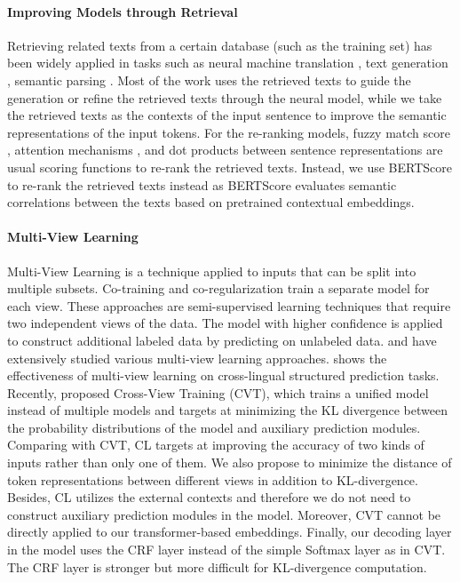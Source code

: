\documentclass[11pt,a4paper]{article}
\begin{document}
\paragraph{Improving Models through Retrieval}
Retrieving related texts from a certain database (such as the training set) has been widely applied in tasks such as neural machine translation \citep{gu2018search,zhang-etal-2018-guiding,xu-etal-2020-boosting}, text generation \citep{weston-etal-2018-retrieve,kim-etal-2020-retrieval}, semantic parsing \citep{hashimoto2018retrieve,guo-etal-2019-coupling}. Most of the work uses the retrieved texts to guide the generation or refine the retrieved texts through the neural model, while we take the retrieved texts as the contexts of the input sentence to improve the semantic representations of the input tokens.
For the re-ranking models, fuzzy match score \citep{gu2018search,zhang-etal-2018-guiding,hayati-etal-2018-retrieval,xu-etal-2020-boosting}, attention mechanisms \citep{cao-etal-2018-retrieve,cai-etal-2019-retrieval}, and dot products between sentence representations \citep{lewis2020retrieval,xu-etal-2020-boosting} are usual scoring functions to re-rank the retrieved texts. Instead, we use BERTScore to re-rank the retrieved texts instead as BERTScore evaluates semantic correlations between the texts based on pretrained contextual embeddings.


\paragraph{Multi-View Learning}
Multi-View Learning is a technique applied to inputs that can be split into multiple subsets. Co-training \citep{blum1998combining} and co-regularization \citep{sindhwani2005co} train a separate model for each view. These approaches are semi-supervised learning techniques that require two independent views of the data. The model with higher confidence is applied to construct additional labeled data by predicting on unlabeled data. \citet{sun2013survey} and \citet{xu2013survey} have extensively studied various multi-view learning approaches. \citet{hu2021multi} shows the effectiveness of multi-view learning on cross-lingual structured prediction tasks. Recently, \citet{clark-etal-2018-semi} proposed Cross-View Training (CVT), which trains a unified model instead of multiple models and targets at minimizing the KL divergence between the probability distributions of the model and auxiliary prediction modules. Comparing with CVT, CL targets at improving the accuracy of two kinds of inputs rather than only one of them. We also propose to minimize the distance of token representations between different views in addition to KL-divergence. Besides, CL utilizes the external contexts and therefore we do not need to construct auxiliary prediction modules in the model. Moreover, CVT cannot be directly applied to our transformer-based embeddings. Finally, our decoding layer in the model uses the CRF layer instead of the simple Softmax layer as in CVT. The CRF layer is stronger but more difficult for KL-divergence computation.
\end{document}
